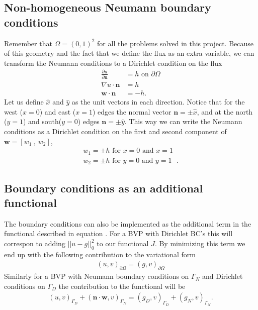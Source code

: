 \subsection{Non-homogeneous Neumann boundary conditions}
Remember that $\Omega = (0,1)^2$ for all the problems solved in this project. Because of this geometry and the fact that we define the flux as an extra variable, we can transform the Neumann conditions to a Dirichlet condition on the flux 
\begin{align}
	\frac{\partial u}{\partial \mathbf{n}} &= h \text{  on   } \partial \Omega \\
	\nabla u \cdot \mathbf{n} &= h \\
	 \mathbf{w} \cdot \mathbf{n} &= -h. 
	\label{eq:neumann}
\end{align}
Let us define $\hat{x}$ and $\hat{y}$ as the unit vectors in each direction. Notice that for the west ($x=0$) and east ($x=1$) edges the normal vector $\mathbf{n}= \pm\hat{x}$, and at the north ($y=1$) and south($y=0$) edges $\mathbf{n}=\pm \hat{y}$. This way we can write the Neumann conditions as a Dirichlet condition on the first and second component of $\mathbf{w}= [ w_1 \:,\: w_2]$, 
\begin{align}
	w_1 = \pm h \text{    for $x = 0$ and $x=1$ }\\
	w_2 = \pm h \text{    for $y = 0$ and $y=1$ }.
	\label{eq:neumannAsDirichlet}
\end{align}
\subsection{Boundary conditions as an additional functional}
The boundary conditions can also be implemented as the additional term in the functional described in equation . For a BVP with Dirichlet BC's this will correspon to adding $||u-g||^2_0$ to our functional $J$. By minimizing this term we end up with the following contribution to the variational form
\begin{align}
	(u,v)_{\partial \Omega}=(g,v)_{\partial \Omega}
	\label{eq:BCFunctionalImplementationContribution}
\end{align}
Similarly for a BVP with Neumann boundary conditions on $\Gamma_N$ and Dirichlet conditions on $\Gamma_D$ the contribution to the functional will be
\begin{align}
	(u,v)_{\Gamma_D} + (\mathbf{n}\cdot \mathbf{w},v)_{\Gamma_N}=
	(g_D,v)_{\Gamma_D} + (g_N,v)_{\Gamma_N}.
	\label{eq:NeuDirFunctional}
\end{align}
